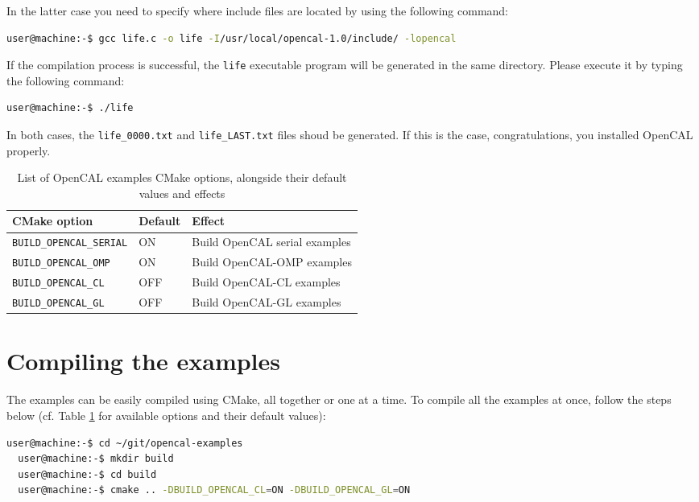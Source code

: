 In the latter case you need to specify where include files are located by using the following command:
\begin{lstlisting}[numbers=none,language=bash,label={ch:quickstart:gcc-full}]
  user@machine:-$ gcc life.c -o life -I/usr/local/opencal-1.0/include/ -lopencal
\end{lstlisting}

If the compilation process is successful, the \verb'life' executable
program will be generated in the same directory. Please execute it by
typing the following command:
\begin{lstlisting}[numbers=none,language=bash,label={ch:quickstart:gcc}]
  user@machine:-$ ./life
\end{lstlisting}

In both cases, the \verb'life_0000.txt' and \verb'life_LAST.txt' files
shoud be generated. If this is the case, congratulations, you
installed OpenCAL properly.


\begin{table}[h]
  \centering
  \caption{List of OpenCAL examples CMake options, alongside their default values and
    effects}
  \label{ch:installation:cmakeoptions-example}
  \begin{tabular}{lll}
    \hline
    CMake option &  Default & Effect\\
    \hline
    \verb'BUILD_OPENCAL_SERIAL' & ON  & Build OpenCAL serial examples\\
    \verb'BUILD_OPENCAL_OMP'    & ON  & Build OpenCAL-OMP examples\\
    \verb'BUILD_OPENCAL_CL'     & OFF & Build OpenCAL-CL examples\\
    \verb'BUILD_OPENCAL_GL'     & OFF & Build OpenCAL-GL examples\\
     \hline
  \end{tabular}
\end{table}


\section{Compiling the examples}

The examples can be easily compiled using CMake, all together or one
at a time. To compile all the examples at once, follow the steps below
(cf. Table \ref{ch:installation:cmakeoptions-example} for available
options and their default values):

\begin{lstlisting}[numbers=none,language=bash]
  user@machine:-$ cd ~/git/opencal-examples
  user@machine:-$ mkdir build
  user@machine:-$ cd build
  user@machine:-$ cmake .. -DBUILD_OPENCAL_CL=ON -DBUILD_OPENCAL_GL=ON
\end{lstlisting}

